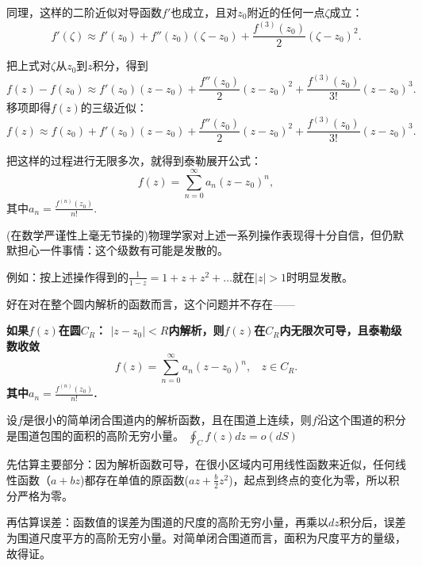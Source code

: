 \documentclass[CJK]{beamer}
\begin{document}
\begin{frame}
  \bch
  同理，这样的二阶近似对导函数$f'$也成立，且对$z_0$附近的任何一点$\zeta$成立：
$$    f'(\zeta) \approx f'(z_0) + f''(z_0)(\zeta-z_0) + \frac{f^{(3)}(z_0)}{2} (\zeta - z_0)^2.  $$

  把上式对$\zeta$从$z_0$到$z$积分，得到
  $$     f(z) - f(z_0)  \approx  f'(z_0)(z-z_0) + \frac{f''(z_0)}{2} (z-z_0)^2 + \frac{f^{(3)}(z_0)}{3!}(z-z_0)^3. $$
  移项即得$f(z)$的三级近似：
  \begin{equation}
    f(z)  \approx f(z_0) + f'(z_0)(z-z_0) + \frac{f''(z_0)}{2} (z-z_0)^2 + \frac{f^{(3)}(z_0)}{3!}(z-z_0)^3. \nonumber
  \end{equation}
  
  \ech
\end{frame}


\begin{frame}
  \bch
  把这样的过程进行无限多次，就得到{\blue 泰勒展开公式：
  $$f(z) = \sum_{n=0}^\infty a_n(z-z_0)^n,$$
  其中$a_n = \frac{f^{(n)}(z_0)}{n!}$.}

  \skiplines

  (在数学严谨性上毫无节操的)物理学家对上述一系列操作表现得十分自信，但仍默默担心一件事情：这个级数有可能是发散的。

  例如：按上述操作得到的$\frac{1}{1-z} = 1+z+z^2+\ldots$就在$|z|>1$时明显发散。

  \skiplines
  
  好在对在整个圆内解析的函数而言，这个问题并不存在——
  \ech
\end{frame}


\begin{frame}
  \bch
  {\blue \bf
  如果$f(z)$在圆$C_R$： $|z-z_0|< R$内解析，则$f(z)$在$C_R$内无限次可导，且泰勒级数收敛
  $$f(z) = \sum_{n=0}^\infty a_n(z-z_0)^n, \  \ \ \ z\in C_R.$$
  其中$a_n = \frac{f^{(n)}(z_0)}{n!}$.
  }
  \ech
\end{frame}

\begin{frame}
  \bch
      {\blue 设$f$是很小的简单闭合围道内的解析函数，且在围道上连续，则$f$沿这个围道的积分是围道包围的面积的高阶无穷小量。
        $\oint_C f(z)dz = o(dS)$
        }

  \bitem
  \item{  先估算主要部分：因为解析函数可导，在很小区域内可用线性函数来近似，任何线性函数（$a+bz$)都存在单值的原函数($az+\frac{b}{2}z^2$)，起点到终点的变化为零，所以积分严格为零。}

  \item {再估算误差：函数值的误差为围道的尺度的高阶无穷小量，再乘以$dz$积分后，误差为围道尺度平方的高阶无穷小量。对简单闭合围道而言，面积为尺度平方的量级，故得证。}
  \eitem
  \ech
\end{frame}
\end{document}

